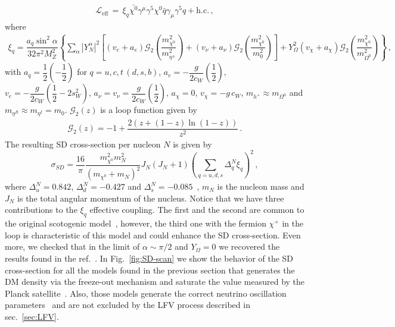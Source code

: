 \documentclass[12pt,letterpaper]{article}
\begin{document}
%
\begin{align}
\label{eq:LSD-eff}
\mathcal{L}_{\text{eff}}\, =\, \xi_q \bar{\chi^0}\gamma^{\mu}\gamma^5 \chi^0 \bar{q}\gamma_{\mu}\gamma^5q + \text{h.c.}\,,
\end{align}
%
where
%
\begin{align}
\label{eq:xiq}
\xi_q = \dfrac{a_q \sin^2\alpha }{32\pi^2M_Z^2}
\left\{
\sum_{\alpha}|Y_N^{\alpha} |^2\left[
(v_{e}+a_{e}) \mathcal{G}_2\left(\dfrac{m_{\chi^0}^2}{m_{\eta^{\pm}}^2}\right) 
+ (v_{\nu}+a_{\nu}) \mathcal{G}_2\left(\dfrac{m_{\chi^0}^2}{m_0^2}\right) 
\right]
+ 
Y_{\Omega}^2(v_{\chi}+a_{\chi}) \mathcal{G}_2\left(\dfrac{m_{\chi^0}^2}{m_{\Omega^0}^2}\right) 
\right\}\,,
\end{align}
%
with $a_q = \dfrac{1}{2} \left(-\dfrac{1}{2}\right)$ for $q=u,c,t\, (d,s,b)$, $a_{e} = -\dfrac{g}{2c_W}\left(\dfrac{1}{2}\right)$, $v_{e} = -\dfrac{g}{2c_W}\left(\dfrac{1}{2}-2s^2_W \right)$, $a_\nu = v_\nu = \dfrac{g}{2c_W}\left(\dfrac{1}{2}\right)$, $a_{\chi} = 0$, $v_{\chi} = -g\, c_W$, $m_{h^+}\approx m_{\Omega^0}$ and $ m_{\eta^R}\approx m_{\eta^I}=m_0$. $\mathcal{G}_2(z)$ is a loop function given by
%
\begin{align}
\label{eq:G2}
\mathcal{G}_2(z) = -1 + \dfrac{2(z+(1-z)\ln(1-z))}{z^2}\,.
\end{align}
%
The resulting SD cross-section per nucleon  $N$  is given by
%
\begin{equation}
\label{eq:SD}
\sigma_{SD}=\dfrac{16}{\pi}\dfrac{m_{\chi^0}^2m_N^2}{(m_{\chi^0}+m_N)^2}J_N(J_N+1)\left(\sum_{q=u,d,s}\Delta_q^N \xi_q\right)^2 \,,
\end{equation}
where $\Delta_u^N=0.842$, $\Delta_d^N= -0.427$ and $\Delta_s^N= -0.085$~\cite{Airapetian:2006vy}, $m_N$ is the nucleon mass and $J_N$ is the  total angular momentum of the nucleus. 
Notice that we have three contributions to the $\xi_q$ effective coupling. 
The first and the second are common to the original scotogenic model~\cite{Ma:2006km}, however, the third one with the fermion $\chi^{+}$ in the loop is characteristic of this model and could enhance the SD cross-section. Even more, we checked that in the limit of $\alpha\sim\pi/2$ and $Y_{\Omega}=0$ we recovered the results found in the ref.~\cite{Ibarra:2016dlb}.
In Fig.~\ref{fig:SD-scan} we show the behavior of the SD cross-section for all the models found in the previous section that generates the DM density via the freeze-out mechanism and saturate the value measured by the Planck satellite~\cite{Aghanim:2018eyx}. Also, those models generate the correct neutrino oscillation parameters~\cite{deSalas:2017kay} and are not excluded by the LFV process described in sec.~\ref{sec:LFV}. 
\end{document}
